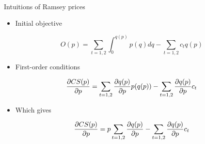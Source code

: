 \documentclass{class}
\begin{document}
\begin{frame}{Intuitions of Ramsey prices}\label{ramsey_init}

\begin{itemize}
    \item Initial objective

\begin{equation*}
    O(p) = \sum_{t = 1,2}\int_0^{q(p)} p(q)  dq - \sum_{t = 1,2} c_t q(p)
\end{equation*}

\vfill

\item First-order conditions

\begin{equation*}
    \pdv{CS(p)}{p} =  \sum_{t = 1,2}  \pdv{q(p)}{p} p(q(p)) -  \sum_{t = 1,2} \pdv{q(p)}{p} c_t 
\end{equation*}

\vfill

\item Which gives

\begin{equation*}
    \pdv{CS(p)}{p} =  p \sum_{t = 1,2}  \pdv{q(p)}{p}  -  \sum_{t = 1,2} \pdv{q(p)}{p} c_t 
\end{equation*}

\end{itemize}

\vfill

\hyperlink{RamseyPrices}{} 

\end{frame}


\end{document}
